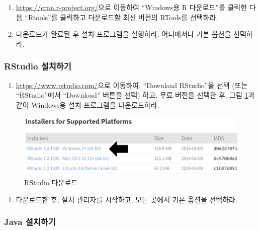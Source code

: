 \documentclass[10.5pt]{book}
\providecommand{\tightlist}{%
  \setlength{\itemsep}{0pt}\setlength{\parskip}{0pt}}
\theoremstyle{definition}
\theoremstyle{definition}
\theoremstyle{definition}
\theoremstyle{remark}
\begin{document}
\begin{enumerate}
\def\labelenumi{\arabic{enumi}.}
\item
  \url{https://cran.r-project.org/}으로 이동하여 ``Windows용 R
  다운로드''를 클릭한 다음 ``Rtools''를 클릭하고 다운로드할 최신 버전의
  RTools를 선택하라.
\item
  다운로드가 완료된 후 설치 프로그램을 실행하라. 어디에서나 기본 옵션을
  선택하라.
\end{enumerate}

\subsubsection*{RStudio 설치하기}\label{rstudio-}

\begin{enumerate}
\def\labelenumi{\arabic{enumi}.}
\tightlist
\item
  \url{https://www.rstudio.com/}으로 이동하여, ``Download RStudio''을
  선택 (또는 ``RStudio''에서 ``Download'' 버튼을 선택) 하고, 무료 버전을
  선택한 후, 그림 \ref{fig:downloadRStudio}과 같이 Windows용 설치
  프로그램을 다운로드하라.
\end{enumerate}

\begin{figure}

{\centering \includegraphics[width=1\linewidth]{images/OhdsiAnalyticsTools/downloadRStudio} 

}

\caption{RStudio 다운로드}\label{fig:downloadRStudio}
\end{figure}

\begin{enumerate}
\def\labelenumi{\arabic{enumi}.}
\setcounter{enumi}{1}
\tightlist
\item
  다운로드한 후, 설치 관리자를 시작하고, 모든 곳에서 기본 옵션을
  선택하라.
\end{enumerate}

\subsubsection*{Java 설치하기}\label{java-}
\end{document}
